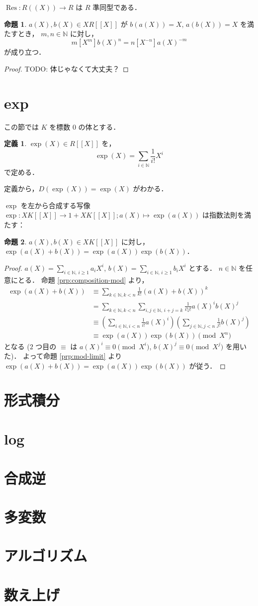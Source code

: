 \documentclass{jsarticle}
\DeclareMathOperator{\Res}{Res}
\newcommand{\N}{\mathbb{N}}
\newcommand{\longto}{\longrightarrow}
\theoremstyle{definition}
\newtheorem*{Dfn}{定義}
\newtheorem{Prp}{命題}
\newenvironment{dfn}{\vspace{1ex}\begin{screen}\begin{Dfn}}{\end{Dfn}\end{screen}\vspace{1ex}}
\newenvironment{prp}{\vspace{1ex}\begin{screen}\begin{Prp}}{\end{Prp}\end{screen}}
\newenvironment{prf}{\begin{leftbar}\begin{proof}}{\end{proof}\end{leftbar}}
\begin{document}
$\Res\colon R((X)) \longto R$ は $R$ 準同型である．

\begin{prp}
  $a(X), b(X) \in X R[[X]]$ が $b(a(X)) = X$, $a(b(X)) = X$ を満たすとき，
  $m, n \in \N$ に対し，
  \[
    m [X^m] b(X)^n = n [X^{-n}] a(X)^{-m}
  \]
  が成り立つ．
\end{prp}
\begin{prf}
  TODO: 体じゃなくて大丈夫？
\end{prf}


\section{exp}
この節では $K$ を標数 $0$ の体とする．

\begin{dfn}
  $\exp(X) \in R[[X]]$ を，
  \[
    \exp(X) = \sum_{i\in\N} \frac{1}{i!} X^i
  \]
  で定める．
\end{dfn}

定義から，$D(\exp(X)) = \exp(X)$ がわかる．

$\exp$ を左から合成する写像 $\exp\colon X K[[X]] \longto 1 + X K[[X]]; a(X) \longmapsto \exp(a(X))$ は指数法則を満たす：

\begin{prp}
  $a(X), b(X) \in X K[[X]]$ に対し，$\exp(a(X) + b(X)) = \exp(a(X)) \exp(b(X))$．
\end{prp}
\begin{prf}
  $a(X) = \sum_{i\in\N,\,i\ge 1} a_i X^i$, $b(X) = \sum_{i\in\N,\,i\ge 1} b_i X^i$ とする．
  $n \in \N$ を任意にとる．
  命題 \ref{prp:composition-mod} より，
  \begin{align*}
    \exp(a(X) + b(X))
    &\equiv \sum_{k\in\N,k<n} \frac{1}{k!} (a(X) + b(X))^k \\
    &= \sum_{k\in\N,k<n} \sum_{i,j\in\N,\,i+j=k} \frac{1}{i! j!} a(X)^i b(X)^j \\
    &\equiv \left(\sum_{i\in\N,i<n} \frac{1}{i!} a(X)^i\right) \left(\sum_{j\in\N,j<n} \frac{1}{j!} b(X)^j\right) \\
    &\equiv \exp(a(X)) \exp(b(X))
    \pmod{X^n}
  \end{align*}
  となる ($2$ つ目の $\equiv$ は $a(X)^i \equiv 0 \pmod{X^i}$, $b(X)^j \equiv 0 \pmod{X^j}$ を用いた)．
  よって命題 \ref{prp:mod-limit} より $\exp(a(X) + b(X)) = \exp(a(X)) \exp(b(X))$ が従う．
\end{prf}




\section{形式積分}
\section{log}
\section{合成逆}
\section{多変数}
\section{アルゴリズム}
\section{数え上げ}
\end{document}
